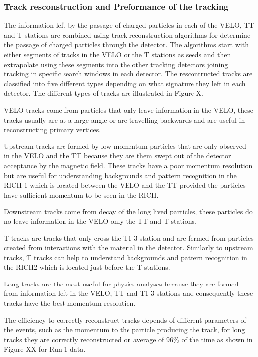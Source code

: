 \subsubsection{Track resconstruction and Preformance of the tracking}
\label{Track_recon}


The information left by the passage of charged particles in each of the VELO, TT and T stations are combined using track reconstruction algorithms for determine the passage of charged particles through the detector. The algorithms start with either segments of tracks in the VELO or the T stations as seeds and then extrapolate using these segments into the other tracking detectors joining tracking in specific search windows in each detector. The rescontructed tracks are classified into five different types depending on what signature they left in each detector. The different types of tracks are illustrated in Figure X. 

VELO tracks come from particles that only leave information in the VELO, these tracks usually are at a large angle or are travelling backwards and are useful in reconstructing primary vertices.

Upstream tracks are formed by low momentum particles that are only observed in the VELO and the TT because they are them swept out of the detector acceptance by the magnetic field. These tracks have a poor momentum resolution but are useful for understanding backgrounds and pattern recognition in the RICH 1 which is located between the VELO and the TT provided the particles have sufficient momentum to be seen in the RICH.

Downstream tracks come from decay of the long lived particles, these particles do no leave information in the VELO only the TT and T stations. 

T tracks are tracks that only cross the T1-3 station and are formed from particles created from interactions with the material in the detector. Similarly to upstream tracks, T tracks can help to understand backgrounds and pattern recognition in the RICH2 which is located just before the T stations.

Long tracks are the most useful for physics analyses because they are formed from information left in the VELO, TT and T1-3 stations and consequently these tracks have the best momentum resolution.

The efficiency to correctly reconstruct tracks depends of different parameters of the events, such as the momentum to the particle producing the track, for long tracks they are correctly reconstructed on average of 96$\%$ of the time as shown in Figure XX for Run 1 data. 

